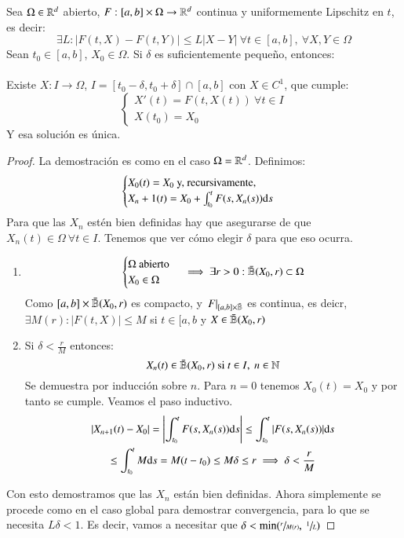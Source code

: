 \begin{thm}\label{thm:exist-unic-local}
    Sea $\Omega \in \mathbb{R}^d$ abierto, $F:[a, b] \times \Omega \to \mathbb{R}^d$ continua y uniformemente Lipschitz en $t$, es decir:
    $$
        \exists L : |F(t, X) - F(t, Y)| \leq L |X - Y| \ \forall t \in [a, b],\ \forall X, Y \in \Omega
    $$
    Sean $t_0 \in [a, b]$, $X_0 \in \Omega$. Si $\delta$ es suficientemente pequeño, entonces:\\\\
    Existe $X:I \to \Omega$, $I = [t_0 - \delta, t_0 + \delta] \cap [a, b]$ con $X \in C^1$, que cumple:
    $$
    \begin{cases}
        X'(t) = F(t, X(t))\ \forall t \in I\\
        X(t_0) = X_0
    \end{cases}
    $$
    Y esa solución es única.
\end{thm}
\begin{proof}
    La demostración es como en el caso $\Omega = \mathbb{R}^d$. Definimos:
    $$
        \begin{cases}
            X_0(t) = X_0 \text{ y, recursivamente, }\\
            X_n+1(t) = X_0 + \int_{t_0}^t F(s, X_n(s)) \mathrm{d} s
        \end{cases}
    $$
    Para que las $X_n$ estén bien definidas hay que asegurarse de que $X_n(t) \in \Omega\ \forall t \in I$. Tenemos que ver cómo elegir $\delta$ para que eso ocurra.
    \begin{enumerate}
        \item
        $$
            \begin{cases}
                \Omega \text{ abierto}\\
                X_0 \in \Omega
            \end{cases} \implies \exists r > 0 : \bar{\mathbb{B}}(X_0, r) \subset \Omega
        $$
        Como $[a, b] \times \bar{\mathbb{B}}(X_0, r)$ es compacto, y $\left. F \right|_{[a, b]\times\bar{\mathbb{B}}}$ es continua, es deicr, $\exists M(r) : |F(t, X)| \leq M$ si $t \in [a, b$ y $X \in  \bar{\mathbb{B}}(X_0, r)$
        \item Si $\delta < \frac{r}{M}$ entonces:
        $$
            X_n(t) \in \bar{\mathbb{B}}(X_0, r) \text{ si } t\in I,\ n \in \mathbb{N}
        $$
        Se demuestra por inducción sobre $n$. Para $n=0$ tenemos $X_0(t) = X_0$ y por tanto se cumple. Veamos el paso inductivo.\\
        \begin{gather*}
            |X_{n+1}(t) - X_0 | = \left| \int_{t_0}^t F(s, X_n(s)) \mathrm{d} s \right| \leq \int_{t_0}^t |F(s, X_n(s))| \mathrm{d} s\\ \leq \int_{t_0}^t M\mathrm{d} s = M(t - t_0) \leq M \delta \leq r \implies \delta < \frac{r}{M}
        \end{gather*}
    \end{enumerate}
    Con esto demostramos que las $X_n$ están bien definidas. Ahora simplemente se procede como en el caso global para demostrar convergencia, para lo que se necesita $L\delta < 1$. Es decir, vamos a necesitar que $\delta < \min (\sfrac{r}{M(r)},\ \sfrac{1}{L})$
\end{proof}

